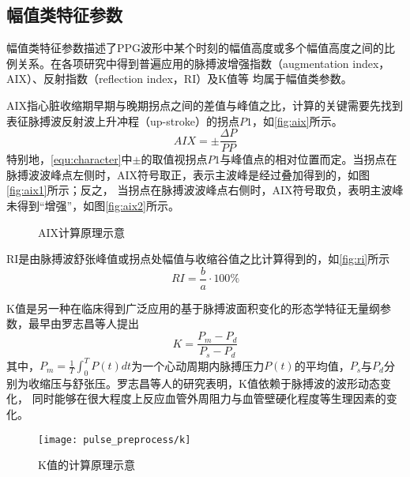 \subsection{幅值类特征参数}

幅值类特征参数描述了PPG波形中某个时刻的幅值高度或多个幅值高度之间的比例关系。在各项研究中得到普遍应用的脉搏波增强指数（augmentation index，AIX）、反射指数（reflection index，RI）及K值等
均属于幅值类参数。

AIX指心脏收缩期早期与晚期拐点之间的差值与峰值之比，计算的关键需要先找到表征脉搏波反射波上升冲程（up-stroke）的拐点$P1$，如\autoref{fig:aix}所示\cite{Su2014}。
\begin{equation}
    \label{equ:aix}
    AIX = \pm \frac{\Delta P}{PP}
\end{equation}
特别地，\autoref{equ:character}中$\pm$的取值视拐点$P1$与峰值点的相对位置而定。当拐点在脉搏波波峰点左侧时，AIX符号取正，表示主波峰是经过叠加得到的，如图\autoref{fig:aix1}所示；反之，
当拐点在脉搏波波峰点右侧时，AIX符号取负，表明主波峰未得到“增强”，如图\autoref{fig:aix2}所示。
\begin{figure}[htbp]
    \centering
    \quad
    \caption[AIX计算原理示意]{\label{fig:aix}AIX计算原理示意\cite{Su2014}}
\end{figure}

RI是由脉搏波舒张峰值或拐点处幅值与收缩谷值之比计算得到的，如\autoref{fig:ri}所示\cite{Su2014,Elgendi2012}
\begin{equation}
    \label{equ:ri}
    RI = \frac{b}{a} \cdot 100\%
\end{equation}

K值是另一种在临床得到广泛应用的基于脉搏波面积变化的形态学特征无量纲参数，最早由罗志昌等人提出\cite{Luo1988,PPGYY}
\begin{equation}
    \label{equ:ppgk}
    K=\frac{P_m-P_d}{P_s-P_d}
\end{equation}
其中，$P_m=\frac{1}{T}\int_{0}^{T}P(t)dt$为一个心动周期内脉搏压力$P(t)$的平均值，$P_s$与$P_d$分别为收缩压与舒张压。罗志昌等人的研究表明，K值依赖于脉搏波的波形动态变化，
同时能够在很大程度上反应血管外周阻力与血管壁硬化程度等生理因素的变化。
\begin{figure}[htbp]
    \centering
    \texttt{[image: pulse\_preprocess/k]}
    \caption{\label{fig:k}K值的计算原理示意}
\end{figure}

